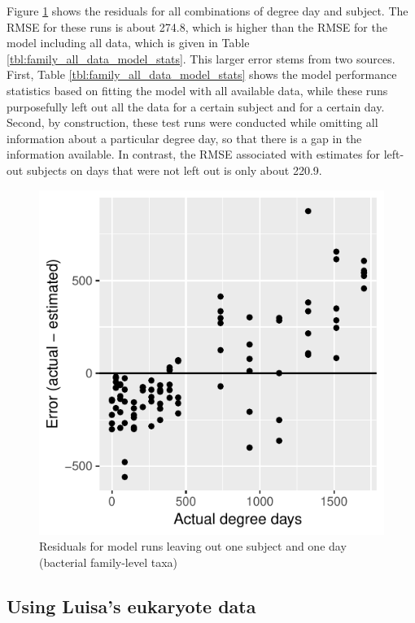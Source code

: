 \documentclass{article}
\begin{document}
Figure \ref{fig:leave_one_out_resids_bac_family_taxa} shows the
residuals for all combinations of degree day and subject.  The RMSE
for these runs is about 274.8, which is higher than the RMSE for the
model including all data, which is given in Table
\ref{tbl:family_all_data_model_stats}.  This larger error stems from
two sources.  First, Table \ref{tbl:family_all_data_model_stats} shows
the model performance statistics based on fitting the model with all
available data, while these runs purposefully left out all the data
for a certain subject and for a certain day.  Second, by construction,
these test runs were conducted while omitting all information about a
particular degree day, so that there is a gap in the information
available.  In contrast, the RMSE associated with estimates for
left-out subjects on days that were not left out is only about 220.9.

\begin{figure}
  \centering
  \includegraphics{../revise_algorithm/only_families/all_time_steps/hit_1perc_twice/leave_out_one_subj_and_one_day_residuals}
  \caption{Residuals for model runs leaving out one subject and one day (bacterial family-level taxa)}
  \label{fig:leave_one_out_resids_bac_family_taxa}
\end{figure}


\subsection{Using Luisa's eukaryote data}
\end{document}
